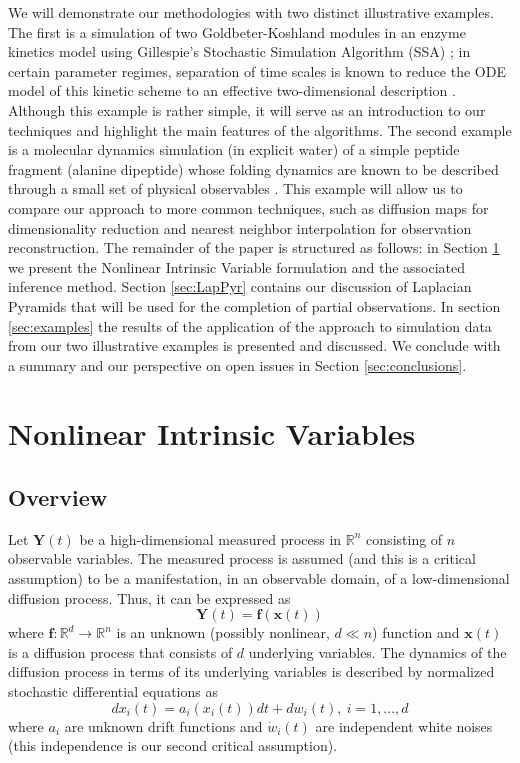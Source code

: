 \documentclass[aip,jcp,preprint]{revtex4-1}
\begin{document}
We will demonstrate our methodologies with two distinct illustrative examples.
%
The first is a simulation
of two Goldbeter-Koshland modules in an enzyme kinetics model using Gillespie's Stochastic Simulation
Algorithm (SSA) \cite{gillespie1977exact};
in certain parameter regimes, separation of time scales is known
to reduce the ODE model of this kinetic scheme to an effective two-dimensional description \cite{zagaris2012stability}.
%
Although this example is rather simple, it will serve as an introduction to our techniques and highlight the main features of the algorithms.
%
The second example is a molecular dynamics
simulation (in explicit water) of a simple peptide fragment (alanine dipeptide) whose folding
dynamics are known to be described through a small set of physical observables \cite{bolhuis2000reaction}.
%
This example will allow us to compare our approach to more common techniques,
such as diffusion maps for dimensionality reduction
and nearest neighbor interpolation for observation reconstruction.
%
The remainder of the paper is structured as follows: in Section \ref{sec:NIV} we present the Nonlinear Intrinsic Variable formulation and
the associated inference method.
%
Section \ref{sec:LapPyr} contains our discussion of Laplacian Pyramids that
will be used for the completion of partial observations.
%
In section \ref{sec:examples} the results
of the application of the approach to simulation data from our two illustrative examples is presented and discussed.
%
We conclude with a summary and our perspective on open issues in Section \ref{sec:conclusions}.

\section{Nonlinear Intrinsic Variables} \label{sec:NIV}

\subsection{Overview}
Let $\mathbf{Y}(t)$ be a high-dimensional measured process in $\mathbb{R}^n$ consisting of $n$ observable variables.
%
The measured process is assumed (and this is a critical assumption) to be a manifestation, in an observable domain, of a low-dimensional diffusion process. Thus, it can be expressed as
\begin{equation}
	\mathbf{Y}(t) = \mathbf{f}(\mathbf{x}(t))
\end{equation}
where $\mathbf{f}:\mathbb{R}^d \rightarrow \mathbb{R}^n$ is an unknown (possibly nonlinear, $d \ll n$) function and $\mathbf{x}(t)$ is a diffusion process that consists of $d$ underlying variables.
%
The dynamics of the diffusion process in terms of its underlying variables is described by normalized stochastic differential equations as
\begin{equation}
	d x_i(t) = a_i (x_i(t)) dt + d w_i(t), \ i=1,\ldots,d
\end{equation}
where $a_i$ are unknown drift functions and $\dot{w}_i(t)$ are independent white noises (this independence is our second critical assumption).
\end{document}
